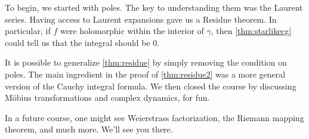 To begin, we started with poles. The key to understanding them was the Laurent series.
\laurentdefi*
\noindent Having access to Laurent expansions gave us a Residue theorem.
\residuethm*
\noindent In particular, if $f$ were holomorphic within the interior of $\gamma$, then \autoref{thm:starlikecg} could tell us that the integral should be $0$.

It is possible to generalize \autoref{thm:residue} by simply removing the condition on poles.
\residueagainthm*
\noindent The main ingredient in the proof of \autoref{thm:residue2} was a more general version of the Cauchy integral formula.
\cifagainagainthm*
\noindent We then closed the course by discussing M\"obius transformations and complex dynamics, for fun.
\begin{remark}
	In a future course, one might see Weierstrass factorization, the Riemann mapping theorem, and much more. We'll see you there.
\end{remark}